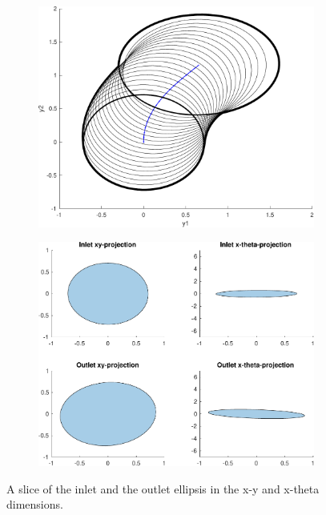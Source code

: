 \begin{figure}
  \begin{subfigure}[c]{0.45\textwidth}
    \includegraphics[width=.95\textwidth]{figures/experiments/sos-calculation}
  \end{subfigure}
  \quad
  \begin{subfigure}[c]{0.45\textwidth}
    \includegraphics[width=.95\textwidth]{figures/experiments/sos-calculation-inlet-outlet}
  \end{subfigure}
  \caption[A slice of the inlet and the outlet ellipsis]{A slice of the inlet and the outlet ellipsis in the x-y and
    x-theta dimensions.}
  \label{fig:funnel-conv}
\end{figure}

